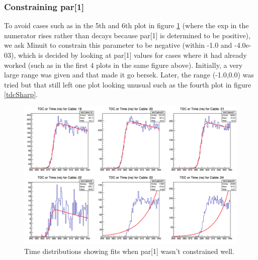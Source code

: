 \documentclass[12pt,epsfig]{article}
\begin{document}
\subsubsection{Constraining par[1]}
To avoid cases such as in the 5th and 6th plot in figure \ref{tdcPosExp} %
(where the exp in the numerator rises rather than decays because par[1] is determined to be positive), 
we ask Minuit to constrain this parameter to be negative (within -1.0 and -4.0e-03), which is decided by looking 
at par[1] values for cases where it had already worked (such as in the first 4 plots in the same figure above). 
Initially, a very large range was given and that made it go bersek. Later, the range (-1.0,0.0) was tried but that 
still left one plot looking unusual such as the fourth plot in figure \ref{tdcSharp}.

\begin{figure}
    \centering
    \includegraphics[width=1.0\textwidth]{Figures/tdcForRun085_Cables19to24.png}
    \caption{Time distributions showing fits when par[1] wasn't constrained well.}
    \label{tdcPosExp}
\end{figure}
\end{document}
